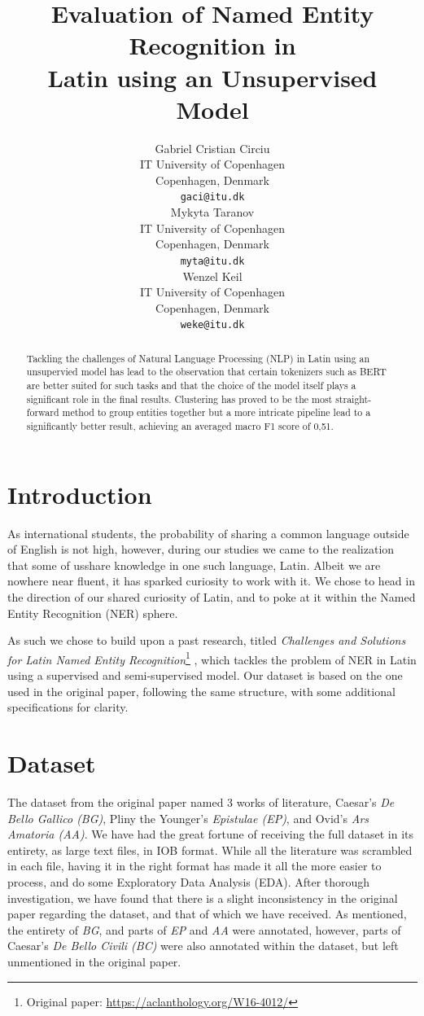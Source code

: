 \documentclass[11pt]{article}
\title{Evaluation of Named Entity Recognition in \\ Latin using an Unsupervised Model}
\author{
  Gabriel Cristian Circiu \\
  IT University of Copenhagen \\ Copenhagen, Denmark \\
  \texttt{gaci@itu.dk} \\\And
  Mykyta Taranov \\
  IT University of Copenhagen \\ Copenhagen, Denmark \\
  \texttt{myta@itu.dk} \\\And
  Wenzel Keil \\
  IT University of Copenhagen \\ Copenhagen, Denmark \\
  \texttt{weke@itu.dk}
}
\begin{document}
\maketitle
\begin{abstract}
Tackling the challenges of Natural Language Processing (NLP) in Latin using an unsupervied model has lead to the observation that certain tokenizers 
such as BERT are better suited for such tasks and that the choice of the model itself plays a significant role in the final results.
Clustering has proved to be the most straight-forward method to group entities together but a more intricate pipeline lead to a significantly 
better result, achieving an averaged macro F1 score of 0,51.
\end{abstract}

\section{Introduction}

As international students, the probability of sharing a common language outside of English is not high, however, during our studies we came to the 
realization that some of usshare knowledge in one such language, Latin. Albeit we are nowhere near fluent, it has sparked curiosity to work with it.
We chose to head in the direction of our shared curiosity of Latin, and to poke at it within the Named Entity Recognition (NER) sphere.

As such we chose to build upon a past research, titled 
\textit{Challenges and Solutions for Latin Named Entity Recognition}\footnote{Original paper: \url{https://aclanthology.org/W16-4012/}}
\cite{erdmann-etal-2016-challenges}, which tackles the problem of NER in Latin using a supervised and semi-supervised model.
Our dataset is based on the one used in the original paper, following the same structure, with some additional specifications for clarity.

\section{Dataset}

The dataset from the original paper named 3 works of literature, Caesar's \textit{De Bello Gallico (BG)}, Pliny the Younger's \textit{Epistulae (EP)},
and Ovid's \textit{Ars Amatoria (AA)}. We have had the great fortune of receiving the full dataset in its entirety, as large text files, in IOB format.
While all the literature was scrambled in each file, having it in the right format has made it all the more easier to process, and do some
Exploratory Data Analysis (EDA). After thorough investigation, we have found that there is a slight inconsistency in the original paper regarding 
the dataset, and that of which we have received. As mentioned, the entirety of \textit{BG}, and parts of \textit{EP} and \textit{AA} were annotated,
however, parts of Caesar's \textit{De Bello Civili (BC)} were also annotated within the dataset, but left unmentioned in the original paper.
\end{document}
